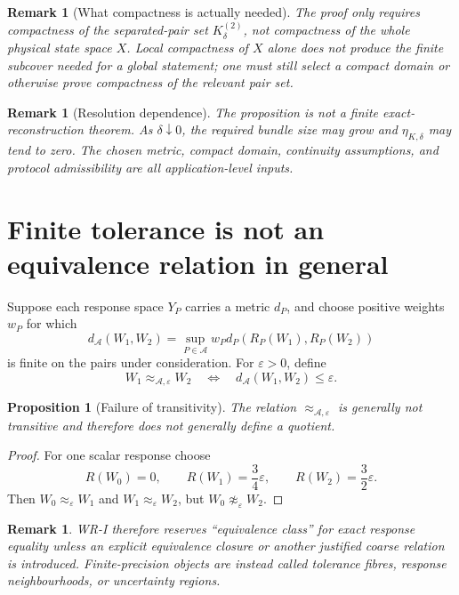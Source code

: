 \documentclass[11pt]{article}
\newtheorem{proposition}[definition]{Proposition}
\newtheorem{remark}[definition]{Remark}
\newcommand{\Acal}{\mathcal A}
\begin{document}
\begin{remark}[What compactness is actually needed]
The proof only requires compactness of the separated-pair set
$K^{(2)}_{\delta}$, not compactness of the whole physical state space $X$.
Local compactness of $X$ alone does not produce the finite subcover needed for
a global statement; one must still select a compact domain or otherwise prove
compactness of the relevant pair set.
\end{remark}

\begin{remark}[Resolution dependence]
The proposition is not a finite exact-reconstruction theorem. As
$\delta\downarrow0$, the required bundle size may grow and
$\eta_{K,\delta}$ may tend to zero. The chosen metric, compact domain,
continuity assumptions, and protocol admissibility are all application-level
inputs.
\end{remark}

\section{Finite tolerance is not an equivalence relation in general}

Suppose each response space $Y_P$ carries a metric $d_P$, and choose positive
weights $w_P$ for which
\[
d_{\Acal}(W_1,W_2)
=
\sup_{P\in\Acal}w_P d_P(R_P(W_1),R_P(W_2))
\]
is finite on the pairs under consideration. For $\varepsilon>0$, define
\[
W_1\approx_{\Acal,\varepsilon}W_2
\quad\Longleftrightarrow\quad
 d_{\Acal}(W_1,W_2)\le\varepsilon.
\]

\begin{proposition}[Failure of transitivity]\label{prop:tolerance}
The relation $\approx_{\Acal,\varepsilon}$ is generally not transitive and
therefore does not generally define a quotient.
\end{proposition}

\begin{proof}
For one scalar response choose
\[
R(W_0)=0,
\qquad
R(W_1)=\frac34\varepsilon,
\qquad
R(W_2)=\frac32\varepsilon.
\]
Then $W_0\approx_\varepsilon W_1$ and
$W_1\approx_\varepsilon W_2$, but
$W_0\not\approx_\varepsilon W_2$.
\end{proof}

\begin{remark}
WR-I therefore reserves ``equivalence class'' for exact response equality
unless an explicit equivalence closure or another justified coarse relation is
introduced. Finite-precision objects are instead called tolerance fibres,
response neighbourhoods, or uncertainty regions.
\end{remark}
\end{document}
